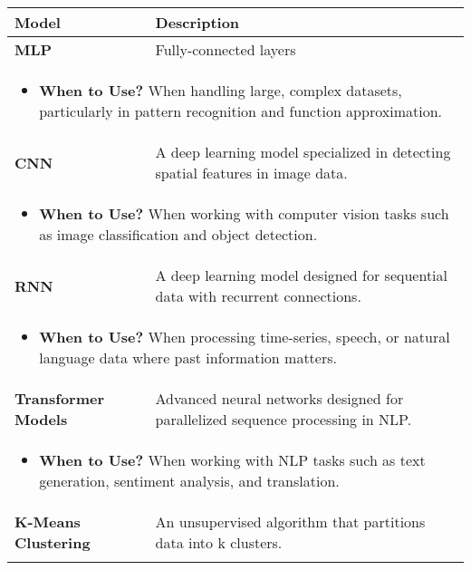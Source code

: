 \documentclass{article}
\begin{document}
\begin{summary}
    \begin{center}
        \begin{tabular}{ll}
        \toprule
        \textbf{Model} & \textbf{Description} \\
        \midrule
        \textbf{MLP} & Fully-connected layers \\
        \multicolumn{2}{p{\linewidth}}{
        \begin{itemize}
            \item \textbf{When to Use?} When handling large, complex datasets, particularly in pattern recognition and function approximation.
        \end{itemize}} \\
        \midrule
        \textbf{CNN} & A deep learning model specialized in detecting spatial features in image data. \\
        \multicolumn{2}{p{\linewidth}}{
        \begin{itemize}
            \item \textbf{When to Use?} When working with computer vision tasks such as image classification and object detection.
        \end{itemize}} \\
        \midrule
        \textbf{RNN} & A deep learning model designed for sequential data with recurrent connections. \\
        \multicolumn{2}{p{\linewidth}}{
        \begin{itemize}
            \item \textbf{When to Use?} When processing time-series, speech, or natural language data where past information matters.
        \end{itemize}} \\
        \midrule
        \textbf{Transformer Models} & Advanced neural networks designed for parallelized sequence processing in NLP. \\
        \multicolumn{2}{p{\linewidth}}{
        \begin{itemize}
            \item \textbf{When to Use?} When working with NLP tasks such as text generation, sentiment analysis, and translation.
        \end{itemize}} \\
        \midrule
        \textbf{K-Means Clustering} & An unsupervised algorithm that partitions data into k clusters. \\
        \multicolumn{2}{p{\linewidth}}{
}
\end{tabular}
\end{center}
\end{summary}
\end{document}
